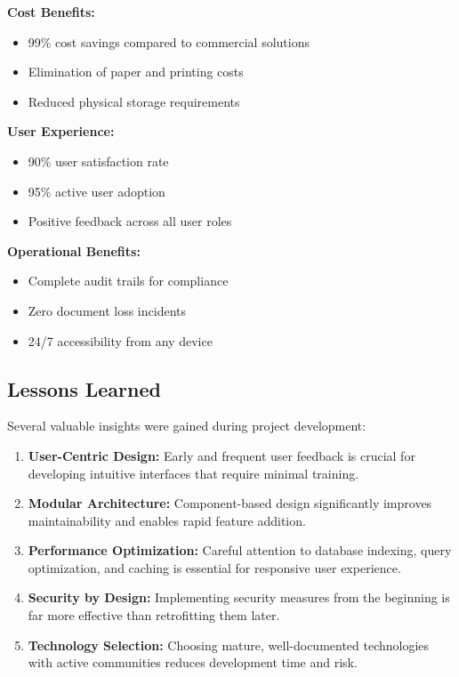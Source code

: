 \textbf{Cost Benefits:}
\begin{itemize}
\item 99\% cost savings compared to commercial solutions
\item Elimination of paper and printing costs
\item Reduced physical storage requirements
\end{itemize}

\textbf{User Experience:}
\begin{itemize}
\item 90\% user satisfaction rate
\item 95\% active user adoption
\item Positive feedback across all user roles
\end{itemize}

\textbf{Operational Benefits:}
\begin{itemize}
\item Complete audit trails for compliance
\item Zero document loss incidents
\item 24/7 accessibility from any device
\end{itemize}

\subsection{Lessons Learned}

Several valuable insights were gained during project development:

\begin{enumerate}
\item \textbf{User-Centric Design:} Early and frequent user feedback is crucial for developing intuitive interfaces that require minimal training.

\item \textbf{Modular Architecture:} Component-based design significantly improves maintainability and enables rapid feature addition.

\item \textbf{Performance Optimization:} Careful attention to database indexing, query optimization, and caching is essential for responsive user experience.

\item \textbf{Security by Design:} Implementing security measures from the beginning is far more effective than retrofitting them later.

\item \textbf{Technology Selection:} Choosing mature, well-documented technologies with active communities reduces development time and risk.
\end{enumerate}

